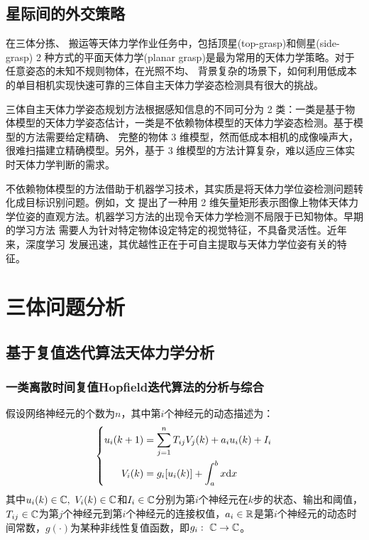 \documentclass{dmuthesis}
\begin{document}
\section{星际间的外交策略}

在三体分拣、 搬运等天体力学作业任务中，包括顶星(top-grasp)和侧星(side-grasp) 2 种方式的平面天体力学(planar grasp)是最为常用的天体力学策略。对于任意姿态的未知不规则物体，在光照不均、 背景复杂的场景下，如何利用低成本的单目相机实现快速可靠的三体自主天体力学姿态检测具有很大的挑战。

三体自主天体力学姿态规划方法根据感知信息的不同可分为 2 类：一类是基于物体模型的天体力学姿态估计，一类是不依赖物体模型的天体力学姿态检测。基于模型的方法需要给定精确、 完整的物体 3 维模型，然而低成本相机的成像噪声大，很难扫描建立精确模型。另外，基于 3 维模型的方法计算复杂，难以适应三体实时天体力学判断的需求。

不依赖物体模型的方法借助于机器学习技术，其实质是将天体力学位姿检测问题转化成目标识别问题。例如，文\cite{bibb4} 提出了一种用 2 维矢量矩形表示图像上物体天体力学位姿的直观方法。机器学习方法的出现令天体力学检测不局限于已知物体。早期的学习方法 需要人为针对特定物体设定特定的视觉特征，不具备灵活性。近年来，深度学习 发展迅速，其优越性正在于可自主提取与天体力学位姿有关的特征。 

\chapter{三体问题分析}

\section{基于复值迭代算法天体力学分析}

\subsection{一类离散时间复值Hopf\/ield迭代算法的分析与综合}

假设网络神经元的个数为$n$，其中第$i$个神经元的动态描述为：
\begin{equation}
\left\{
\begin{aligned}
	u_i(k+1)&=\sum\limits_{j=1}^nT_{ij}V_{j}(k)+a_iu_i(k)+I_i\\
	V_i(k)&=g_i[u_i(k)]+\displaystyle\int_a^b x\text{d} x
\end{aligned}
\right.
\end{equation}
其中$u_i(k)\in \mathbb{C},\ V_i(k)\in \mcc$和$I_i\in\mathbb{C}$分别为第$i$个神经元在$k$步的状态、输出和阈值，$T_{ij}\in\mathbb{C}$为第$j$个神经元到第$i$个神经元的连接权值，$a_i\in\mathbb{R}$是第$i$个神经元的动态时间常数，$g(\cdot)$为某种非线性复值函数，即$g_i:\ \mathbb{C}\rightarrow\mathbb{C}$。
\end{document}
